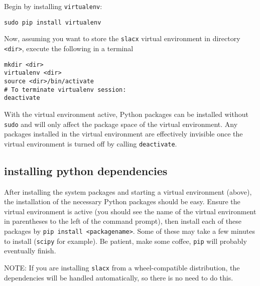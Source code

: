 Begin by installing \verb|virtualenv|:
\begin{lstlisting}
sudo pip install virtualenv
\end{lstlisting}

Now, assuming you want to store the \verb|slacx| virtual environment
in directory \verb|<dir>|,
execute the following in a terminal
\begin{lstlisting}
mkdir <dir> 
virtualenv <dir>
source <dir>/bin/activate
# To terminate virtualenv session:
deactivate
\end{lstlisting}

With the virtual environment active,
Python packages can be installed without \verb|sudo|
and will only affect the package space of the virtual environment.
Any packages installed in the virtual environment are effectively invisible
once the virtual environment is turned off by calling \verb|deactivate|.


\subsection{installing python dependencies}

After installing the system packages and starting a virtual environment (above),
the installation of the necessary Python packages should be easy.
Ensure the virtual environment is active
(you should see the name of the virtual environment 
in parentheses to the left of the command prompt),
then install each of these packages by \verb|pip install <packagename>|.
Some of these may take a few minutes to install (\verb|scipy| for example).
Be patient, make some coffee, \verb|pip| will probably eventually finish.

NOTE: If you are installing \verb|slacx| 
from a wheel-compatible distribution, 
the dependencies will be handled automatically,
so there is no need to do this.

